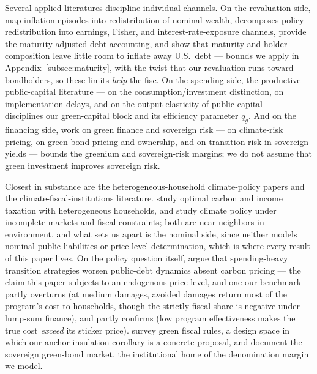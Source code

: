 \documentclass[12pt]{article}
\begin{document}
Several applied literatures discipline individual channels. On the
revaluation side, \citet{doepkeschneider2006} map inflation episodes into
redistribution of nominal wealth, \citet{auclert2019} decomposes policy
redistribution into earnings, Fisher, and interest-rate-exposure channels,
\citet{hallsargent2011} provide the maturity-adjusted debt accounting, and
\citet{hilscher2022} show that maturity and holder composition leave little
room to inflate away U.S.\ debt --- bounds we apply in
Appendix~\ref{subsec:maturity}, with the twist that our revaluation runs
toward bondholders, so these limits \emph{help} the fisc. On the spending side, the
productive-public-capital literature --- \citet{baxterking1993} on the
consumption/investment distinction, \citet{leeperwalkeryang2010} on
implementation delays, and \citet{bomligthart2014} on the output elasticity of
public capital --- disciplines our green-capital block and its efficiency
parameter $q_g$. And on the financing side, work on green finance and sovereign
risk --- \citet{gigliokellystroebel2021} on climate-risk pricing,
\citet{bakergreenbonds} on green-bond pricing and ownership, and
\citet{bis2025sovereign} on transition risk in sovereign yields --- bounds the
greenium and sovereign-risk margins; we do not assume that green investment
improves sovereign risk.

Closest in substance are the heterogeneous-household climate-policy papers and
the climate-fiscal-institutions literature. \citet{douennehummelpedroni} study
optimal carbon and income taxation with heterogeneous households, and
\citet{ddhp} study climate policy under incomplete markets and fiscal
constraints; both are near neighbors in environment, and what sets us apart is
the nominal side, since neither models nominal public liabilities or
price-level determination, which is where every result of this paper lives. On
the policy question itself, \citet{imf2024climatedebt} argue that spending-heavy
transition strategies worsen public-debt dynamics absent carbon pricing --- the
claim this paper subjects to an endogenous price level, and one our benchmark
partly overturns (at medium damages, avoided damages return most of the
program's cost to households, though the strictly fiscal share is negative
under lump-sum finance), and partly confirms (low program effectiveness makes
the true cost \emph{exceed} its sticker price). \citet{caselli2024greenfiscalrules} survey
green fiscal rules, a design space in which our anchor-insulation corollary is a
concrete proposal, and \citet{ando2022sovereignclimate} document the sovereign
green-bond market, the institutional home of the denomination margin we model.
\end{document}
